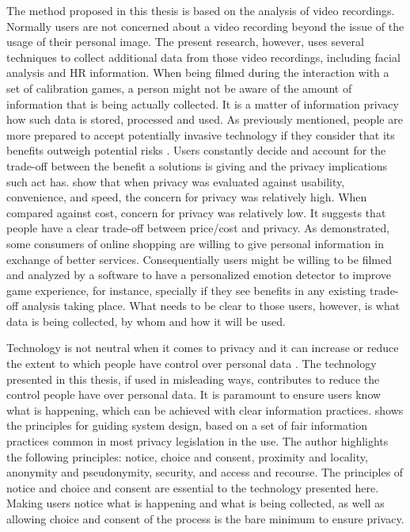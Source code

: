 The method proposed in this thesis is based on the analysis of video recordings. Normally users are not concerned about a video recording beyond the issue of the usage of their personal image. The present research, however, uses several techniques to collect additional data from those video recordings, including facial analysis and HR information. When being filmed during the interaction with a set of calibration games, a person might not be aware of the amount of information that is being actually collected. It is a matter of information privacy how such data is stored, processed and used. As previously mentioned, people are more prepared to accept potentially invasive technology if they consider that its benefits outweigh potential risks \parencite{ladd1991computers}. Users constantly decide and account for the trade-off between the benefit a solutions is giving and the privacy implications such act has. \textcite{nguyen2016effects} show that when privacy was evaluated against usability, convenience, and speed, the concern for privacy was relatively high. When compared against cost, concern for privacy was relatively low. It suggests that people have a clear trade-off between price/cost and privacy. As \textcite{awad2006personalization} demonstrated, some consumers of online shopping are willing to give personal information in exchange of better services. Consequentially users might be willing to be filmed and analyzed by a software to have a personalized emotion detector to improve game experience, for instance, specially if they see benefits in any existing trade-off analysis taking place. What needs to be clear to those users, however, is what data is being collected, by whom and how it will be used.

Technology is not neutral when it comes to privacy and it can increase or reduce the extent to which people have control over personal data \parencite{bellotti1993design}. The technology presented in this thesis, if used in misleading ways, contributes to reduce the control people have over personal data. It is paramount to ensure users know what is happening, which can be achieved with clear information practices. \textcite{langheinrich2001privacy} shows the principles for guiding system design, based on a set of fair information practices common in most privacy legislation in the use. The author highlights the following principles: notice, choice and consent, proximity and locality, anonymity and pseudonymity, security, and access and recourse. The principles of notice and choice and consent are essential to the technology presented here. Making users notice what is happening and what is being collected, as well as allowing choice and consent of the process is the bare minimum to ensure privacy.

